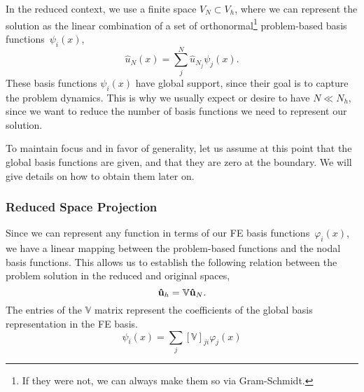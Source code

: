 \documentclass[../../1_heat_equation.tex]{subfiles}
\newcommand{\rbV}{\ensuremath{\mathbb{V}}}
\begin{document}
In the reduced context, we use a finite space $V_N \subset V_h$, where we can represent the solution as the linear combination of a set of orthonormal\footnote{If they were not, we can always make them so via Gram-Schmidt.} problem-based basis functions~$\psi_i(x)$,
\begin{equation}
    \label{eq:1d_rom_heat_equation_rb_expansion}
    \hat{u}_N(x) = \sum_j^{N} \hat{u}_{N_j} \psi_j(x).
\end{equation}
These basis functions $\psi_i(x)$ have global support, since their goal is to capture the problem dynamics. 
This is why we usually expect or desire to have $N \ll N_h$, since we want to reduce the number of basis functions we need to represent our solution. 

To maintain focus and in favor of generality, let us assume at this point that the global basis functions are given, and that they are zero at the boundary.
We will give details on how to obtain them later on.

\subsubsection{Reduced Space Projection}
Since we can represent any function in terms of our FE basis functions~$\varphi_i(x)$, 
we have a linear mapping between the problem-based functions and the nodal basis functions.
This allows us to establish the following relation between the problem solution in the reduced and original spaces,
\begin{equation}
    \label{eq:1d_rom_heat_equation_projection_relation}
    \vb{\hat{u}}_h = \rbV \vb{\hat{u}}_N.
\end{equation}
The entries of the $\rbV$ matrix represent the coefficients of the global basis representation in the FE basis. 
\begin{equation}
    \psi_i(x) = \sum_j \left[\mathbb{V}\right]_{ji}\varphi_j(x) 
\end{equation}
\end{document}
